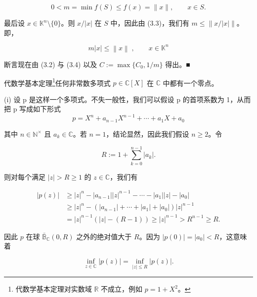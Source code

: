 \begin{example}
\begin{items}
\begin{subitems}
\begin{equation}
0<m=\min f(S)\leq f(x)=\|x\|,\qquad x\in S.
\end{equation}

最后设 $ x \in \mathbb{K}^n \setminus \{0\} $。则 $ x/|x| $ 在 $ S $ 中，因此由 (3.3)，我们有 $ m \leq \|x/|x|\| $。即，

\begin{equation}
m\left|x\right|\leq\left\|x\right\|\;,\qquad x\in\mathbb{K}^{n}
\end{equation}

断言现在由 (3.2) 与 (3.4) 以及 $ C := \max\{C_0, 1/m\} $ 得出。■

\end{subitems}

\item

代数学基本定理\footnote{代数学基本定理对实数域 $ \mathbb{R} $ 不成立，例如 $ p = 1 + X^2 $。}任何非常数多项式 $ p \in \mathbb{C}[X] $ 在 $ \mathbb{C} $ 中都有一个零点。

\proofhead
(i) 设 p 是这样一个多项式。不失一般性，我们可以假设 p 的首项系数为 1，从而把 p 写成如下形式
\[
p=X^{n}+a_{n-1}X^{n-1}+\cdots+a_{1}X+a_{0}
\]

其中 $ n \in \mathbb{N}^{\times} $ 且 $ a_k \in \mathbb{C} $。若 $ n = 1 $，结论显然，因此我们假设 $ n \geq 2 $。令

\[
R:=1+\sum_{k=0}^{n-1}\left|a_{k}\right|.
\]

则对每个满足 $ |z| > R \geq 1 $ 的 $ z \in \mathbb{C} $，我们有

\begin{equation*}
\begin{aligned}
\left|p(z)\right|&\geq\left|z\right|^{n}-\left|a_{n-1}\right|\left|z\right|^{n-1}-\cdots-\left|a_{1}\right|\left|z\right|-\left|a_{0}\right|\\&\geq\left|z\right|^{n}-\left(\left|a_{n-1}\right|+\cdots+\left|a_{1}\right|+\left|a_{0}\right|\right)\left|z\right|^{n-1}\\&=\left|z\right|^{n-1}\left(\left|z\right|-(R-1)\right)\geq\left|z\right|^{n-1}>R^{n-1}\geq R.
\end{aligned}
\end{equation*}

因此 $p$ 在球 $\bar{\mathbb{B}}_{\mathbb{C}}(0,R)$ 之外的绝对值大于 $R$。因为 $|p(0)| = |a_0| < R$，这意味着

\[
\operatorname*{i n f}_{z\in\mathbb{C}}|p(z)|=\operatorname*{i n f}_{|z|\leq R}|p(z)|.
\]


\end{items}
\end{example}
